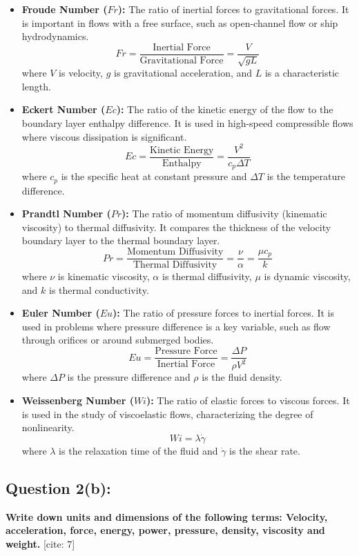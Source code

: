 \documentclass{article}
\begin{document}
\begin{itemize}
    \item \textbf{Froude Number ($Fr$):} The ratio of inertial forces to gravitational forces. It is important in flows with a free surface, such as open-channel flow or ship hydrodynamics.
    $$ Fr = \frac{\text{Inertial Force}}{\text{Gravitational Force}} = \frac{V}{\sqrt{gL}} $$
    where $V$ is velocity, $g$ is gravitational acceleration, and $L$ is a characteristic length.

    \item \textbf{Eckert Number ($Ec$):} The ratio of the kinetic energy of the flow to the boundary layer enthalpy difference. It is used in high-speed compressible flows where viscous dissipation is significant.
    $$ Ec = \frac{\text{Kinetic Energy}}{\text{Enthalpy}} = \frac{V^2}{c_p \Delta T} $$
    where $c_p$ is the specific heat at constant pressure and $\Delta T$ is the temperature difference.

    \item \textbf{Prandtl Number ($Pr$):} The ratio of momentum diffusivity (kinematic viscosity) to thermal diffusivity. It compares the thickness of the velocity boundary layer to the thermal boundary layer.
    $$ Pr = \frac{\text{Momentum Diffusivity}}{\text{Thermal Diffusivity}} = \frac{\nu}{\alpha} = \frac{\mu c_p}{k} $$
    where $\nu$ is kinematic viscosity, $\alpha$ is thermal diffusivity, $\mu$ is dynamic viscosity, and $k$ is thermal conductivity.

    \item \textbf{Euler Number ($Eu$):} The ratio of pressure forces to inertial forces. It is used in problems where pressure difference is a key variable, such as flow through orifices or around submerged bodies.
    $$ Eu = \frac{\text{Pressure Force}}{\text{Inertial Force}} = \frac{\Delta P}{\rho V^2} $$
    where $\Delta P$ is the pressure difference and $\rho$ is the fluid density.

    \item \textbf{Weissenberg Number ($Wi$):} The ratio of elastic forces to viscous forces. It is used in the study of viscoelastic flows, characterizing the degree of nonlinearity.
    $$ Wi = \lambda \dot{\gamma} $$
    where $\lambda$ is the relaxation time of the fluid and $\dot{\gamma}$ is the shear rate.
\end{itemize}
\hrulefill

\subsection*{\textbf{Question 2(b):}}
\textbf{Write down units and dimensions of the following terms: Velocity, acceleration, force, energy, power, pressure, density, viscosity and weight.} [cite: 7]
\end{document}
